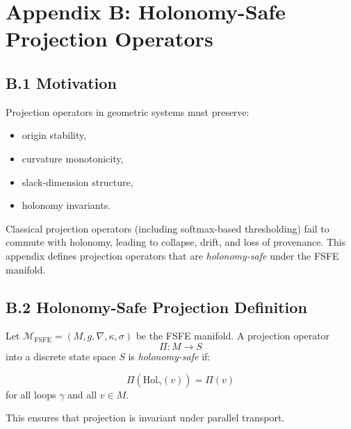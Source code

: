 
\appendix
\section{Appendix B: Holonomy-Safe Projection Operators}
\label{appendix:holosafe}

\subsection{B.1 Motivation}

Projection operators in geometric systems must preserve:

\begin{itemize}
    \item origin stability,
    \item curvature monotonicity,
    \item slack-dimension structure,
    \item holonomy invariants.
\end{itemize}

Classical projection operators (including softmax-based thresholding) fail to
commute with holonomy, leading to collapse, drift, and loss of provenance.
This appendix defines projection operators that are \emph{holonomy-safe} under
the FSFE manifold.

\subsection{B.2 Holonomy-Safe Projection Definition}

Let $\mathcal{M}_{\mathrm{FSFE}} = (M, g, \nabla, \kappa, \sigma)$ be the FSFE
manifold. A projection operator
\[
\Pi : M \rightarrow S
\]
into a discrete state space $S$ is \emph{holonomy-safe} if:

\[
\Pi(\mathrm{Hol}_\gamma(v)) = \Pi(v)
\]
for all loops $\gamma$ and all $v \in M$.

This ensures that projection is invariant under parallel transport.

